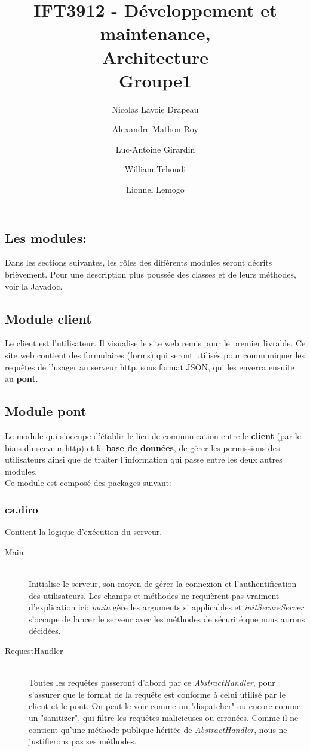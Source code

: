 \documentclass[10pt,a4paper]{report}
\author{Nicolas Lavoie Drapeau \and Alexandre Mathon-Roy \and Luc-Antoine Girardin \and William Tchoudi \and Lionnel Lemogo}
\title{IFT3912 - Développement et maintenance,\\Architecture\\Groupe1}
\begin{document}
\maketitle
\begin{flushleft}
\section{Les modules:}
Dans les sections suivantes, les rôles des différents modules seront décrits brièvement. Pour une description plus poussée des classes et de leurs méthodes, voir la Javadoc.\\
\bigskip
\subsection{Module client}
Le client est l'utilisateur. Il visualise le site web remis pour le premier livrable. Ce site web contient des formulaires (forms) qui seront utilisés pour communiquer les requêtes de l'usager au serveur http, sous format JSON, qui les enverra ensuite au \textbf{pont}.\\
\bigskip
\subsection{Module pont}
Le module qui s'occupe d'établir le lien de communication entre le \textbf{client} (par le biais du serveur http) et la \textbf{base de données}, de gérer les permissions des utilisateurs ainsi que de traiter l'information qui passe entre les deux autres modules.\\
\medskip
Ce module est composé des packages suivant:\\
\bigskip
\subsubsection*{ca.diro}
Contient la logique d'exécution du serveur.\\
\bigskip
\begin{description}
\item[Main] \hfill \\ Initialise le serveur, son moyen de gérer la connexion et l'authentification des utilisateurs. Les champs et méthodes ne requièrent pas vraiment d'explication ici; \emph{main} gère les arguments si applicables et \textit{initSecureServer} s'occupe de lancer le serveur avec les méthodes de sécurité que nous aurons décidées.\\
\item[RequestHandler] \hfill \\ Toutes les requêtes passeront d'abord par ce \emph{AbstractHandler}, pour s'assurer que le format de la requête est conforme à celui utilisé par le client et le pont. On peut le voir comme un "dispatcher" ou encore comme un "sanitizer", qui filtre les requêtes malicieuses ou erronées. Comme il ne contient qu'une méthode publique héritée de \emph{AbstractHandler}, nous ne justifierons pas ses méthodes.\\
\end{description}
\bigskip

\end{flushleft}
\end{document}
